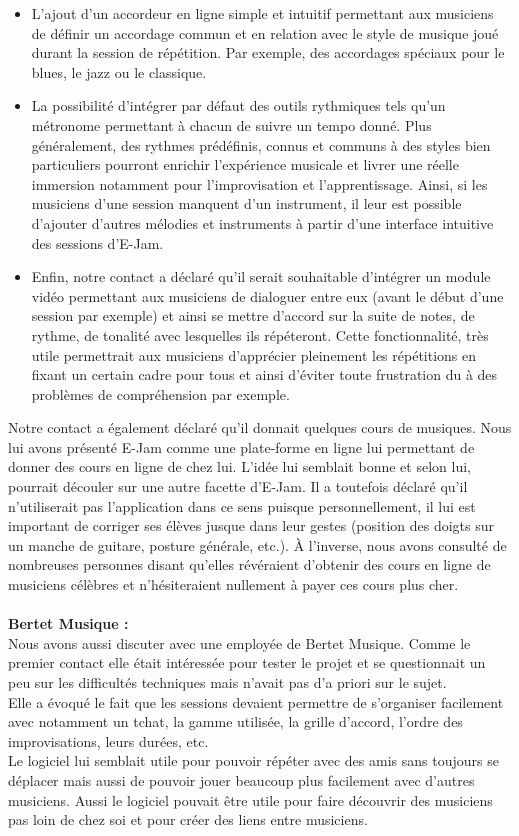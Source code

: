 \documentclass[a4,12pt]{article}
\begin{document}
    \begin{itemize}
        \item L'ajout d'un accordeur en ligne simple et intuitif permettant aux musiciens de définir un accordage commun et en relation avec le style de musique joué durant la session de répétition. Par exemple, des accordages spéciaux pour le blues, le jazz ou le classique.
        \item La possibilité d'intégrer par défaut des outils rythmiques tels qu'un métronome permettant à chacun de suivre un tempo donné. Plus généralement, des rythmes prédéfinis, connus et communs à des styles bien particuliers pourront enrichir l'expérience musicale et livrer une réelle immersion notamment pour l'improvisation et l'apprentissage. Ainsi, si les musiciens d'une session manquent d'un instrument, il leur est possible d'ajouter d'autres mélodies et instruments à partir d'une interface intuitive des sessions d'E-Jam.
        \item Enfin, notre contact a déclaré qu'il serait souhaitable d'intégrer un module vidéo permettant aux musiciens de dialoguer entre eux (avant le début d'une session par exemple) et ainsi se mettre d'accord sur la suite de notes, de rythme, de tonalité avec lesquelles ils répéteront. Cette fonctionnalité, très utile permettrait aux musiciens d'apprécier pleinement les répétitions en fixant un certain cadre pour tous et ainsi d'éviter toute frustration du à des problèmes de compréhension par exemple.
    \end{itemize}
Notre contact a également déclaré qu'il donnait quelques cours de musiques. Nous lui avons présenté E-Jam comme une plate-forme en ligne lui permettant de donner des cours en ligne de chez lui. L'idée lui semblait bonne et selon lui, pourrait découler sur une autre facette d'E-Jam. Il a toutefois déclaré qu'il n'utiliserait pas l'application dans ce sens puisque personnellement, il lui est important de corriger ses élèves jusque dans leur gestes (position des doigts sur un manche de guitare, posture générale, etc.). À l'inverse, nous avons consulté de nombreuses personnes disant qu'elles révéraient d'obtenir des cours en ligne de musiciens célèbres et n'hésiteraient nullement à payer ces cours plus cher.\\
\\

\textbf{Bertet Musique :}\\
Nous avons aussi discuter avec une employée de Bertet Musique. Comme le premier contact elle était intéressée pour tester le projet et se questionnait un peu sur les difficultés techniques mais n’avait pas d’a priori sur le sujet.\\
Elle a évoqué le fait que les sessions devaient permettre de s’organiser facilement avec notamment un tchat, la gamme utilisée, la grille d’accord, l’ordre des improvisations, leurs durées, etc.\\
Le logiciel lui semblait utile pour pouvoir répéter avec des amis sans toujours se déplacer mais aussi de pouvoir jouer beaucoup plus facilement avec d'autres musiciens.
Aussi le logiciel pouvait être utile pour faire découvrir des musiciens pas loin de chez soi et pour créer des liens entre musiciens.\\
\end{document}
